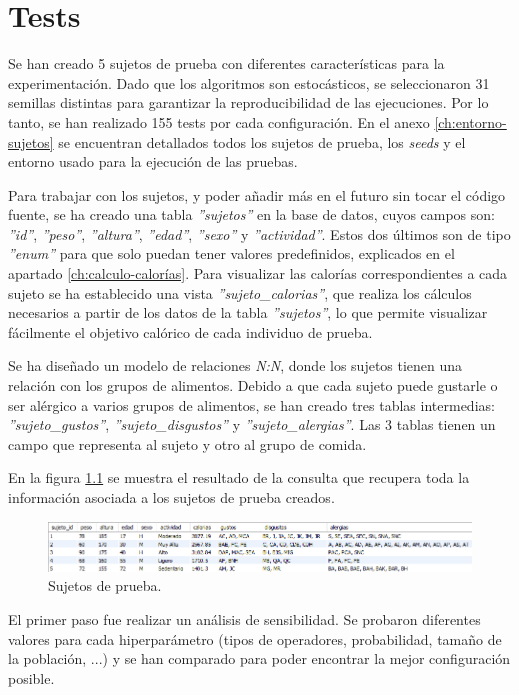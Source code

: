\chapter{Tests}
\label{ch:tests}

Se han creado 5 sujetos de prueba con diferentes características para la experimentación. Dado que los algoritmos son estocásticos, se seleccionaron 31 semillas distintas para garantizar la reproducibilidad de las ejecuciones. Por lo tanto, se han realizado 155 tests por cada configuración. En el anexo \ref{ch:entorno-sujetos} se encuentran detallados todos los sujetos de prueba, los \textit{seeds} y el entorno usado para la ejecución de las pruebas.

Para trabajar con los sujetos, y poder añadir más en el futuro sin tocar el código fuente, se ha creado una tabla \textit{''sujetos''} en la base de datos, cuyos campos son: \textit{''id''}, \textit{''peso''}, \textit{''altura''}, \textit{''edad''}, \textit{''sexo''} y \textit{''actividad''}. Estos dos últimos son de tipo \textit{''enum''} para que solo puedan tener valores predefinidos, explicados en el apartado \ref{ch:calculo-calorías}. Para visualizar las calorías correspondientes a cada sujeto se ha establecido una vista \textit{''sujeto\_calorias''}, que realiza los cálculos necesarios a partir de los datos de la tabla \textit{''sujetos''}, lo que permite visualizar fácilmente el objetivo calórico de cada individuo de prueba.

Se ha diseñado un modelo de relaciones \textit{N:N}, donde los sujetos tienen una relación con los grupos de alimentos. Debido a que cada sujeto puede gustarle o ser alérgico a varios grupos de alimentos, se han creado tres tablas intermedias: \textit{''sujeto\_gustos''}, \textit{''sujeto\_disgustos''} y \textit{''sujeto\_alergias''}. Las 3 tablas tienen un campo que representa al sujeto y otro al grupo de comida.

En la figura \ref{fig:sujetos-prueba} se muestra el resultado de la consulta que recupera toda la información asociada a los sujetos de prueba creados.
\begin{figure}[H]
    \centering
    \includegraphics[width=1\textwidth]{figures/sujetos_prueba.png}
    \caption{Sujetos de prueba.}
    \label{fig:sujetos-prueba}
\end{figure}
\newpage
El primer paso fue realizar un análisis de sensibilidad. Se probaron diferentes valores para cada hiperparámetro (tipos de operadores, probabilidad, tamaño de la población, ...) y se han comparado para poder encontrar la mejor configuración posible.

